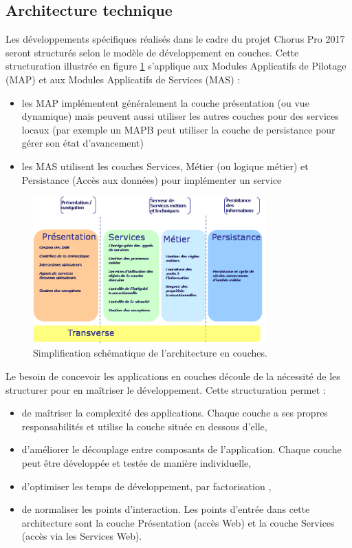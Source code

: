\documentclass[12pt,a4paper]{article}
\begin{document}
\subsection{Architecture technique}
Les développements spécifiques réalisés dans le cadre du projet Chorus Pro 2017 seront structurés selon le modèle de développement en couches. 
Cette structuration illustrée en figure \ref{couches} s’applique aux Modules Applicatifs de Pilotage (MAP) et aux Modules Applicatifs de Services (MAS) :
\begin{itemize}
\item	les MAP implémentent généralement la couche présentation (ou vue dynamique) mais peuvent aussi utiliser les autres couches pour des services locaux (par exemple un MAPB peut utiliser la couche de persistance pour gérer son état d'avancement)
\item	les MAS utilisent les couches Services, Métier (ou logique métier) et Persistance (Accès aux données) pour implémenter un service
\end{itemize}
\begin{figure}[H]
	\begin{center}
		\includegraphics[width=0.8\textwidth,keepaspectratio]{couchesModules.png}
		\caption{Simplification schématique de l'architecture en couches.}
		\label{couches}
	\end{center}
\end{figure}
\clearpage
\newpage
Le besoin de concevoir les applications en couches découle de la nécessité de les structurer pour en maîtriser le développement. Cette structuration permet :
\begin{itemize}
\item	de maîtriser la complexité des applications. Chaque couche a ses propres responsabilités et utilise la couche située en dessous d’elle,
\item	d’améliorer le découplage entre composants de l’application. Chaque couche peut être développée et testée de manière individuelle,
\item	d’optimiser les temps de développement, par factorisation ,
\item	de normaliser les points d’interaction. Les points d’entrée dans cette architecture sont la couche Présentation (accès Web) et la couche Services (accès via les Services Web).
\end{itemize}
\end{document}

